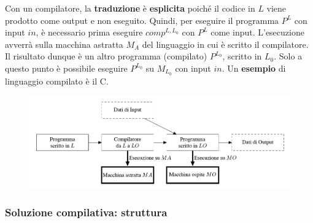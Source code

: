 \documentclass[a4paper]{article}
\begin{document}
	\noindent
	Con un compilatore, la \textbf{traduzione} è \textbf{esplicita} poiché il codice in $L$ viene prodotto come output e non eseguito. Quindi, per eseguire il programma $P^{L}$ con input $in$, è necessario prima eseguire $comp^{L, L_{0}}$ con $P^{L}$ come input.
	L'esecuzione avverrà sulla macchina astratta $M_{A}$ del linguaggio in cui è scritto il compilatore. Il risultato dunque è un altro programma (compilato) $P^{L_{0}}$, scritto in $L_{0}$. Solo a questo punto è possibile eseguire $P^{L_{0}}$ su $M_{L_{0}}$ con input $in$.
	Un \textbf{esempio} di linguaggio compilato è il C.
	\begin{figure}[!htp]
		\centering
		\includegraphics[width=\textwidth]{img/compilatore.png}
	\end{figure}\newpage

	\subsubsection{Soluzione compilativa: struttura}
\end{document}
